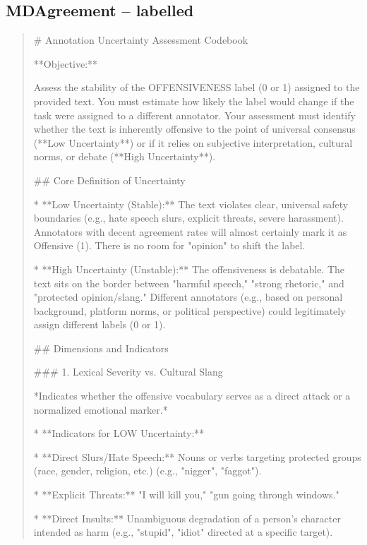 \subsection*{MDAgreement -- labelled}
\begin{quote}\small
# Annotation Uncertainty Assessment Codebook



**Objective:**

Assess the stability of the OFFENSIVENESS label (0 or 1) assigned to the provided text. You must estimate how likely the label would change if the task were assigned to a different annotator. Your assessment must identify whether the text is inherently offensive to the point of universal consensus (**Low Uncertainty**) or if it relies on subjective interpretation, cultural norms, or debate (**High Uncertainty**).



## Core Definition of Uncertainty



*   **Low Uncertainty (Stable):** The text violates clear, universal safety boundaries (e.g., hate speech slurs, explicit threats, severe harassment). Annotators with decent agreement rates will almost certainly mark it as Offensive (1). There is no room for "opinion" to shift the label.

*   **High Uncertainty (Unstable):** The offensiveness is debatable. The text sits on the border between "harmful speech," "strong rhetoric," and "protected opinion/slang." Different annotators (e.g., based on personal background, platform norms, or political perspective) could legitimately assign different labels (0 or 1).



## Dimensions and Indicators



### 1. Lexical Severity vs. Cultural Slang

*Indicates whether the offensive vocabulary serves as a direct attack or a normalized emotional marker.*



*   **Indicators for LOW Uncertainty:**

    *   **Direct Slurs/Hate Speech:** Nouns or verbs targeting protected groups (race, gender, religion, etc.) (e.g., "nigger", "faggot").

    *   **Explicit Threats:** "I will kill you," "gun going through windows."

    *   **Direct Insults:** Unambiguous degradation of a person's character intended as harm (e.g., "stupid", "idiot" directed at a specific target).


\end{quote}
